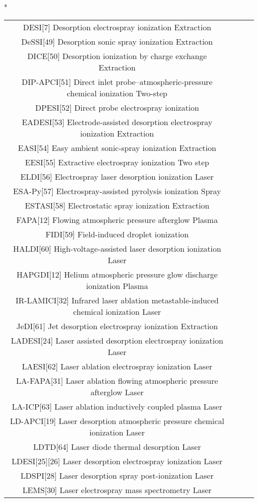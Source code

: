\begin{table}{*}
\begin{tabular}{|c|c|c|l|}
DESI[7] Desorption electrospray ionization Extraction \\
DeSSI[49] Desorption sonic spray ionization Extraction \\
DICE[50] Desorption ionization by charge exchange Extraction \\
DIP-APCI[51] Direct inlet probe–atmospheric-pressure chemical ionization Two-step \\
DPESI[52] Direct probe electrospray ionization  \\
EADESI[53] Electrode-assisted desorption electrospray ionization Extraction \\
EASI[54] Easy ambient sonic-spray ionization Extraction \\
EESI[55] Extractive electrospray ionization Two step \\
ELDI[56] Electrospray laser desorption ionization Laser \\
ESA-Py[57] Electrospray-assisted pyrolysis ionization Spray \\
ESTASI[58] Electrostatic spray ionization Extraction \\
FAPA[12] Flowing atmospheric pressure afterglow Plasma \\
FIDI[59] Field-induced droplet ionization  \\
HALDI[60] High-voltage-assisted laser desorption ionization Laser \\
HAPGDI[12] Helium atmospheric pressure glow discharge ionization Plasma \\
IR-LAMICI[32] Infrared laser ablation metastable-induced chemical ionization Laser \\
JeDI[61] Jet desorption electrospray ionization Extraction \\
LADESI[24] Laser assisted desorption electrospray ionization Laser \\
LAESI[62] Laser ablation electrospray ionization Laser \\
LA-FAPA[31] Laser ablation flowing atmospheric pressure afterglow Laser \\
LA-ICP[63] Laser ablation inductively coupled plasma Laser \\
LD-APCI[19] Laser desorption atmospheric pressure chemical ionization Laser \\
LDTD[64] Laser diode thermal desorption Laser \\
LDESI[25][26] Laser desorption electrospray ionization Laser \\
LDSPI[28] Laser desorption spray post-ionization Laser \\ 
LEMS[30] Laser electrospray mass spectrometry Laser \\

\end{tabular}
\end{table}
